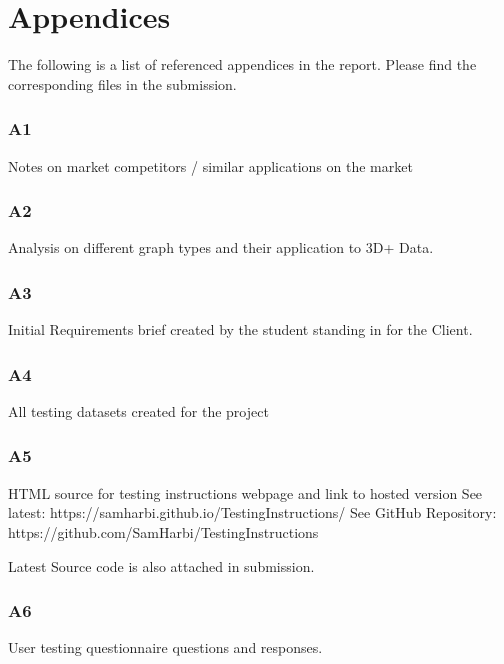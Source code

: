 \section{Appendices}
The following is a list of referenced appendices in the report. Please find the corresponding files in the submission.

\subsubsection{A1} \label{A1}
Notes on market competitors / similar applications on the market

\subsubsection{A2} \label{A2}
Analysis on different graph types and their application to 3D+ Data.

\subsubsection{A3} \label{A3}
Initial Requirements brief created by the student standing in for the Client.

\subsubsection{A4} \label{A4}
All testing datasets created for the project

\subsubsection{A5} \label{A5}
HTML source for testing instructions webpage and link to hosted version
See latest: https://samharbi.github.io/TestingInstructions/
See GitHub Repository: https://github.com/SamHarbi/TestingInstructions

Latest Source code is also attached in submission.

\subsubsection{A6} \label{A6}
User testing questionnaire questions and responses.
